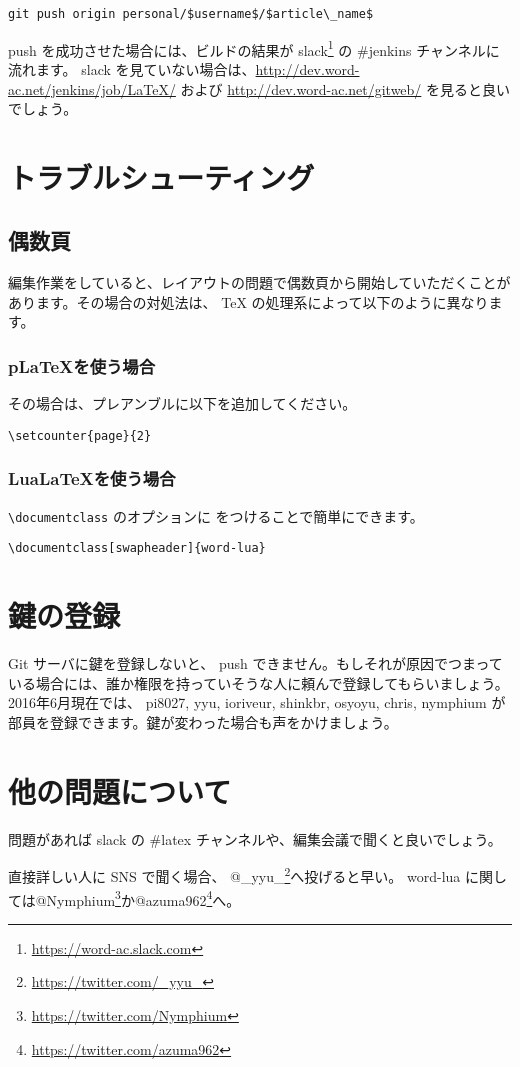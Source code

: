 \begin{lstlisting}[mathescape]
git push origin personal/$username$/$article\_name$
\end{lstlisting}

push を成功させた場合には、ビルドの結果が slack\footnote{\url{https://word-ac.slack.com}} の \#jenkins チャンネルに流れます。
slack を見ていない場合は、\url{http://dev.word-ac.net/jenkins/job/LaTeX/} および \url{http://dev.word-ac.net/gitweb/} を見ると良いでしょう。

\section{トラブルシューティング}

\subsection{偶数頁}

編集作業をしていると、レイアウトの問題で偶数頁から開始していただくことがあります。その場合の対処法は、 TeX の処理系によって以下のように異なります。

\subsubsection{p\LaTeX を使う場合}

その場合は、プレアンブルに以下を追加してください。

\begin{lstlisting}[mathescape]
\setcounter{page}{2}
\end{lstlisting}

\subsubsection{Lua\LaTeX を使う場合}

\lstinline|\documentclass| のオプションに  をつけることで簡単にできます。

\begin{lstlisting}[mathescape]
\documentclass[swapheader]{word-lua}
\end{lstlisting}

\section{鍵の登録}

Git サーバに鍵を登録しないと、 push できません。もしそれが原因でつまっている場合には、誰か権限を持っていそうな人に頼んで登録してもらいましょう。2016年6月現在では、
pi8027, yyu, ioriveur, shinkbr, osyoyu, chris, nymphium が部員を登録できます。鍵が変わった場合も声をかけましょう。

\section{他の問題について}

問題があれば slack の \#latex チャンネルや、編集会議で聞くと良いでしょう。

直接詳しい人に SNS で聞く場合、 @\_yyu\_\footnote{\url{https://twitter.com/_yyu_}}へ投げると早い。
word-lua に関しては@Nymphium\footnote{\url{https://twitter.com/Nymphium}}か@azuma962\footnote{\url{https://twitter.com/azuma962}}へ。

